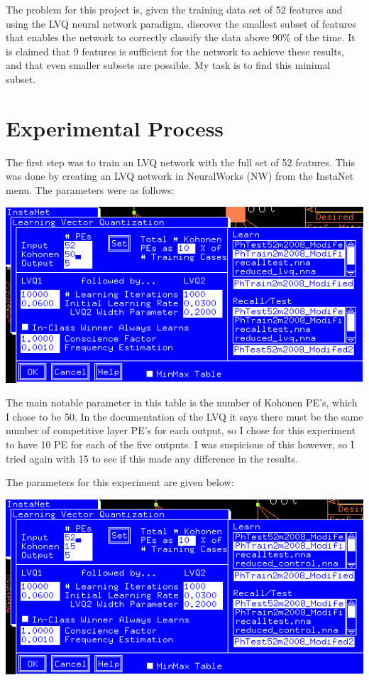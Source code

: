 \documentclass[12pt]{article}
\begin{document}
The problem for this project is, given the training data set of 52 features and using the LVQ neural network paradigm, discover the smallest subset of features that enables the network to correctly classify the data above 90\% of the time.  It is claimed that 9 features is sufficient for the network to achieve these results, and that even smaller subsets are possible.  My task is to find this minimal subset.

\section{Experimental Process}

The first step was to train an LVQ network with the full set of 52 features.  This was done by creating an LVQ network in NeuralWorks (NW) from the InstaNet menu.  The parameters were as follows:

\begin{center}
\includegraphics[scale=0.7]{parameters52features.png}
\end{center}

The main notable parameter in this table is the number of Kohonen PE's, which I chose to be 50.  In the documentation of the LVQ it says there must be the same number of competitive layer PE's for each output, so I chose for this experiment to have 10 PE for each of the five outputs.  I was suspicious of this however, so I tried again with 15 to see if this made any difference in the results.  

The parameters for this experiment are given below:

\begin{center}
\includegraphics[scale=0.7]{parameters52features15PE.png}
\end{center}
\end{document}

